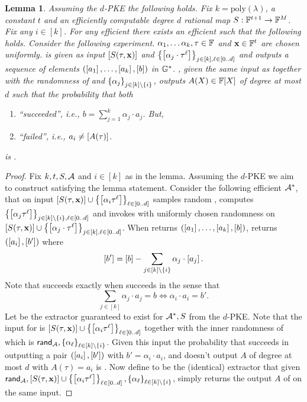 \documentclass[11pt]{article}
\numberwithin{figure}{section} %
\newtheorem{lemma}[thm]{Lemma}
\newcommand{\x}{\ensuremath{\mathbf{x}}\xspace}
\newcommand{\set}[1]{\ensuremath{\left\{#1\right\}}\xspace}
\newcommand{\poly}{\ensuremath{\mathrm{poly}(\lambda)}\xspace}
\begin{document}
\begin{lemma}\label{lem:batchPKE}
Assuming the $d$-PKE the following holds. Fix $k=\poly$,
a constant $t$ and an efficiently computable degree $d$ rational map $S:\mathbb F^{t+1}\to\mathbb F^M$.
Fix any $i\in [k]$.
For any efficient \adv there exists an efficient \ext such that the following holds.
Consider the following experiment.
 $\alpha_1,\ldots\alpha_k,\tau\in \mathbb F$ and $\x\in\F^t$ are chosen uniformly.
 \adv is given as input $\enc{S(\tau,\x)}$ and $\sett{\enc{\alpha_j\cdot \tau^\ell} }{j\in [k], \ell \in [0..d]}$
 and outputs a sequence of elements  $(\left[a_1\right],\ldots, \left[a_k\right],\left[b\right])$ in ${\mathbb G}^*$.
   \ext, given the same input as \adv together with the randomness of \adv and $\sett{\alpha_j}{j\in [k]\setminus\set{i}}$, outputs  
 $A(X) \in \mathbb F[X]$ of degree at most $d$ such that the probability that both
   
 \begin{enumerate}
  \item \adv ``succeeded'', i.e., $b=\sum_{j=1}^k\alpha_j\cdot a_j$. But,
  \item \ext ``failed'', i.e., $a_i \neq \left[A(\tau)\right]$.
   \end{enumerate}
is \neg.
\end{lemma}
\begin{proof}
 Fix $k,t,S,\mathcal A$ and $i\in [k]$ as in the lemma. Assuming the $d$-PKE we aim to construct \ext satisfying the lemma statement. Consider the following efficient $ {\mathcal A}^{\mathbf{*}}$, that on input $\enc{S(\tau,\x)}\cup \sett{\enc{\alpha_i \tau^\ell}}{\ell\in [0..d]}$ samples random \sett{\alpha_\ell\in \Fstar}{\ell\in [k]\setminus\set{i}},  computes $\sett{\enc{\alpha_j \tau^\ell}}{j \in [k]\setminus\set{i}, \ell\in [0..d]}$ and invokes \adv with
 uniformly chosen randomness \randadv on $\enc{S(\tau,\x)}\cup\sett{\enc{\alpha_j\cdot \tau^\ell} }{j\in [k], \ell \in [0..d]}$.
 When \adv returns $(\left[a_1\right],\ldots,\left[a_k\right],\left[b\right]
 )$, \advv returns $(\left[a_i\right],\left[b'\right])$ where
 \[\enc{b'} = \enc{b}-\sum_{j\in [k]\setminus\set{i}} \alpha_j\cdot \enc{a_j}.\]
 Note that \adv succeeds exactly when \advv succeeds in the sense that
 \[\sum_{j\in [k]} \alpha_j\cdot a_j  = b \Leftrightarrow \alpha_i\cdot a_i = b'.\]
 Let \extprime be the extractor guaranteed to exist for $ {\mathcal A}^{\mathbf{*}},S$ from the $d$-PKE.
 Note that the input for \extprime is $\enc{S(\tau,\x)}\cup \sett{\enc{\alpha_i \tau^\ell}}{\ell\in [0..d]}$ together with the inner randomness of \advv which is 
 $\randadv,\sett{\alpha_\ell}{\ell\in [k]\setminus\set{i}}$.
 Given this input the probability that \advv succeeds in outputting a pair $(\left[a_i\right],\left[b'\right])$ with $b'=
 \alpha_i\cdot a_i$, and \ext doesn't output $A$ of degree at most $d$ with $A(\tau) = a_i$ is \negl.
 Now define \ext to be the (identical) extractor that given 
 $\randadv,\enc{S(\tau,\x)}\cup \sett{\enc{\alpha_i \tau^\ell}}{\ell\in [0..d]},\sett{\alpha_\ell}{\ell\in [k] \setminus\set{i}}$,
 simply returns the output $A$ of \extprime on the same input.
\end{proof}
\end{document}
